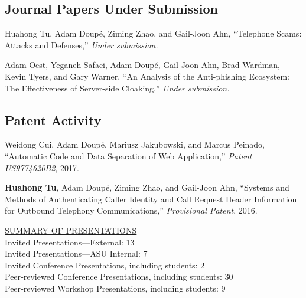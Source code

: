 \documentclass[11pt,letterpaper,sans]{moderncv}
\begin{document}
\subsection{Journal Papers Under Submission}

\begin{etaremune}

  \item Huahong Tu, Adam Doup\'e, Ziming Zhao, and Gail-Joon Ahn, ``Telephone Scams: Attacks and Defenses,'' \emph{Under submission.}

  \item Adam Oest, Yeganeh Safaei, Adam Doup\'e, Gail-Joon Ahn, Brad Wardman, Kevin Tyers, and Gary Warner, ``An Analysis of the Anti-phishing Ecosystem: The Effectiveness of Server-side Cloaking,'' \emph{Under submission.}

\end{etaremune}

\subsection{Patent Activity}

\begin{etaremune}

  \item Weidong Cui, Adam Doup\'e, Mariusz Jakubowski, and Marcus
    Peinado, ``Automatic Code and Data Separation of Web
    Application,'' \emph{Patent US9774620B2}, 2017. 

  \item \textbf{Huahong Tu}, Adam Doup\'e, Ziming Zhao,
    and Gail-Joon Ahn, ``Systems and Methods of Authenticating Caller
    Identity and Call Request Header Information for Outbound
    Telephony Communications,'' \emph{Provisional Patent}, 2016.

  
\end{etaremune}




\begin{framed}
\underline{SUMMARY OF PRESENTATIONS} \\
Invited Presentations---External: 13 \\
Invited Presentations---ASU Internal: 7 \\
Invited Conference Presentations, including students: 2 \\
Peer‐reviewed Conference Presentations, including students: 30 \\
Peer‐reviewed Workshop Presentations, including students: 9 \\
\end{framed}
\end{document}

